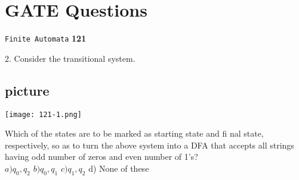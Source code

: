 \documentclass[9pt]{beamer}
\begin{document}
\begin{frame}
\section*{GATE Questions}
\begin{flushright}
 \texttt{Finite Automata} \hspace*{1cm} \textbf{121}
\end{flushright}

\vspace*{0.5cm}

\vspace*{3mm}
\hspace{-0.5cm}
2. Consider the transitional system.\\
\vspace*{3mm}

\begin{center}
\section{picture}
\texttt{[image: 121-1.png]}
\end{center}

Which of the states are to be marked as starting state and fi nal state, respectively, so as to turn the
above system into a DFA that accepts all strings having odd number of zeros and even number of 1’s?\\

\vspace*{0.2cm}
$a) q _{0}, q _{2}$   \hspace*{0.5cm}  $b) q _{0}, q _{1}$   \hspace*{0.5cm}  $c) q _{1}, q _{2}$  \hspace*{0.5cm}   d) None of these\\

\vspace*{0.3cm}

\end{frame}
\end{document}
